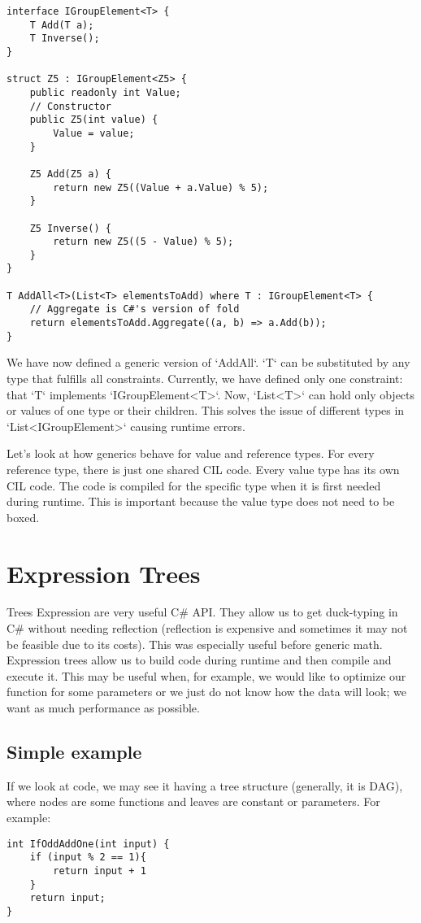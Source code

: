 \begin{lstlisting}
interface IGroupElement<T> {
    T Add(T a);
    T Inverse();
}

struct Z5 : IGroupElement<Z5> {
    public readonly int Value;
    // Constructor
    public Z5(int value) {
        Value = value;
    }

    Z5 Add(Z5 a) {
        return new Z5((Value + a.Value) % 5);
    }

    Z5 Inverse() {
        return new Z5((5 - Value) % 5);
    }
}

T AddAll<T>(List<T> elementsToAdd) where T : IGroupElement<T> {
    // Aggregate is C#'s version of fold
    return elementsToAdd.Aggregate((a, b) => a.Add(b));
}
\end{lstlisting}

We have now defined a generic version of `AddAll`. `T` can be substituted by any type that fulfills all constraints. Currently, we have defined only one constraint: that `T` implements `IGroupElement<T>`. Now, `List<T>` can hold only objects or values of one type or their children. This solves the issue of different types in `List<IGroupElement>` causing runtime errors.

Let's look at how generics behave for value and reference types. For every reference type, there is just one shared CIL code. Every value type has its own CIL code. The code is compiled for the specific type when it is first needed during runtime. This is important because the value type does not need to be boxed. \cite{Generics1}

\section{Expression Trees}
Trees Expression are very useful C\# API. They allow us to get duck-typing in C\# without needing reflection (reflection is expensive and sometimes it may not be feasible due to its costs). This was especially useful before generic math. Expression trees allow us to build code during runtime and then compile and execute it. This may be useful when, for example, we would like to optimize our function for some parameters or we just do not know how the data will look; we want as much performance as possible.
\subsection{Simple example}
If we look at code, we may see it having a tree structure (generally, it is DAG), where nodes are some functions and leaves are constant or parameters. For example: 
\begin{lstlisting}
int IfOddAddOne(int input) {
    if (input % 2 == 1){
        return input + 1
    }
    return input;
}
\end{lstlisting}

